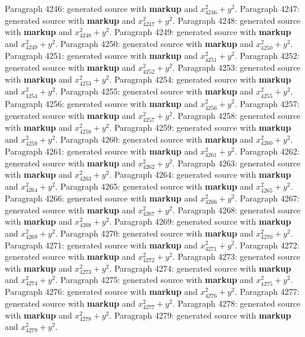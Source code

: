 \documentclass{article}
\begin{document}
Paragraph 4246: generated source with \textbf{markup} and $x_{4246}^2 + y^2$.
Paragraph 4247: generated source with \textbf{markup} and $x_{4247}^2 + y^2$.
Paragraph 4248: generated source with \textbf{markup} and $x_{4248}^2 + y^2$.
Paragraph 4249: generated source with \textbf{markup} and $x_{4249}^2 + y^2$.
Paragraph 4250: generated source with \textbf{markup} and $x_{4250}^2 + y^2$.
Paragraph 4251: generated source with \textbf{markup} and $x_{4251}^2 + y^2$.
Paragraph 4252: generated source with \textbf{markup} and $x_{4252}^2 + y^2$.
Paragraph 4253: generated source with \textbf{markup} and $x_{4253}^2 + y^2$.
Paragraph 4254: generated source with \textbf{markup} and $x_{4254}^2 + y^2$.
Paragraph 4255: generated source with \textbf{markup} and $x_{4255}^2 + y^2$.
Paragraph 4256: generated source with \textbf{markup} and $x_{4256}^2 + y^2$.
Paragraph 4257: generated source with \textbf{markup} and $x_{4257}^2 + y^2$.
Paragraph 4258: generated source with \textbf{markup} and $x_{4258}^2 + y^2$.
Paragraph 4259: generated source with \textbf{markup} and $x_{4259}^2 + y^2$.
Paragraph 4260: generated source with \textbf{markup} and $x_{4260}^2 + y^2$.
Paragraph 4261: generated source with \textbf{markup} and $x_{4261}^2 + y^2$.
Paragraph 4262: generated source with \textbf{markup} and $x_{4262}^2 + y^2$.
Paragraph 4263: generated source with \textbf{markup} and $x_{4263}^2 + y^2$.
Paragraph 4264: generated source with \textbf{markup} and $x_{4264}^2 + y^2$.
Paragraph 4265: generated source with \textbf{markup} and $x_{4265}^2 + y^2$.
Paragraph 4266: generated source with \textbf{markup} and $x_{4266}^2 + y^2$.
Paragraph 4267: generated source with \textbf{markup} and $x_{4267}^2 + y^2$.
Paragraph 4268: generated source with \textbf{markup} and $x_{4268}^2 + y^2$.
Paragraph 4269: generated source with \textbf{markup} and $x_{4269}^2 + y^2$.
Paragraph 4270: generated source with \textbf{markup} and $x_{4270}^2 + y^2$.
Paragraph 4271: generated source with \textbf{markup} and $x_{4271}^2 + y^2$.
Paragraph 4272: generated source with \textbf{markup} and $x_{4272}^2 + y^2$.
Paragraph 4273: generated source with \textbf{markup} and $x_{4273}^2 + y^2$.
Paragraph 4274: generated source with \textbf{markup} and $x_{4274}^2 + y^2$.
Paragraph 4275: generated source with \textbf{markup} and $x_{4275}^2 + y^2$.
Paragraph 4276: generated source with \textbf{markup} and $x_{4276}^2 + y^2$.
Paragraph 4277: generated source with \textbf{markup} and $x_{4277}^2 + y^2$.
Paragraph 4278: generated source with \textbf{markup} and $x_{4278}^2 + y^2$.
Paragraph 4279: generated source with \textbf{markup} and $x_{4279}^2 + y^2$.
\end{document}
